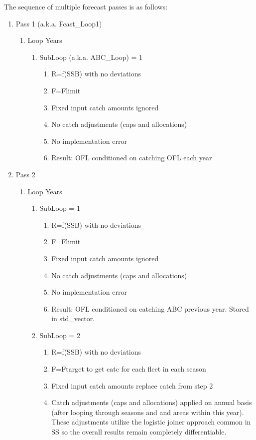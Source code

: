 The sequence of multiple forecast passes is as follows:
\begin{enumerate}
	\item Pass 1 (a.k.a. Fcast\_Loop1)
	\begin{enumerate}
		\item Loop Years
		\begin{enumerate}
			\item SubLoop (a.k.a. ABC\_Loop) = 1
			\begin{enumerate}
				\item R=f(SSB) with no deviations
				\item F=Flimit
				\item Fixed input catch amounts ignored
				\item No catch adjustments (caps and allocations)
				\item No implementation error
				\item Result: OFL conditioned on catching OFL each year
			\end{enumerate}
		\end{enumerate}
	\end{enumerate}
	\item Pass 2
	\begin{enumerate}
		\item Loop Years
		\begin{enumerate}
			\item SubLoop = 1
			\begin{enumerate}
				\item R=f(SSB) with no deviations
				\item F=Flimit
				\item Fixed input catch amounts ignored
				\item No catch adjustments (caps and allocations)
				\item No implementation error
				\item Result: OFL conditioned on catching ABC previous year. Stored in std\_vector.
			\end{enumerate}
			\item SubLoop = 2
			\begin{enumerate}
				\item R=f(SSB) with no deviations
				\item F=Ftarget to get catc for each fleet in each season
				\item Fixed input catch amounts replace catch from step 2
				\item Catch adjustments (caps and allocations) applied on annual basis (after looping through seasons and and areas within this year). These adjustments utilize the logistic joiner approach common in SS so the overall results remain completely differentiable.

\end{enumerate}
\end{enumerate}
\end{enumerate}
\end{enumerate}
